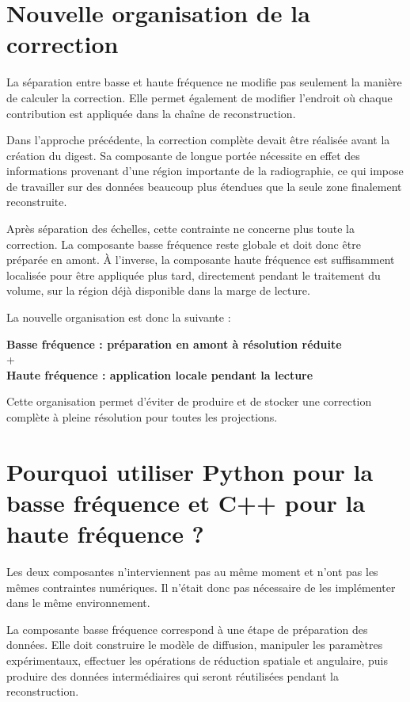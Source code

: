 \documentclass[11pt,a4paper]{report}
\begin{document}
\section{Nouvelle organisation de la correction}

La séparation entre basse et haute fréquence ne modifie pas seulement la
manière de calculer la correction. Elle permet également de modifier
l'endroit où chaque contribution est appliquée dans la chaîne de
reconstruction.

Dans l'approche précédente, la correction complète devait être réalisée
avant la création du digest. Sa composante de longue portée nécessite en
effet des informations provenant d'une région importante de la
radiographie, ce qui impose de travailler sur des données beaucoup plus
étendues que la seule zone finalement reconstruite.

Après séparation des échelles, cette contrainte ne concerne plus toute la
correction. La composante basse fréquence reste globale et doit donc être
préparée en amont. À l'inverse, la composante haute fréquence est
suffisamment localisée pour être appliquée plus tard, directement pendant
le traitement du volume, sur la région déjà disponible dans la marge de
lecture.

La nouvelle organisation est donc la suivante :

\begin{center}
\textbf{Basse fréquence : préparation en amont à résolution réduite}
\\[0.3em]
+
\\[0.3em]
\textbf{Haute fréquence : application locale pendant la lecture}
\end{center}

Cette organisation permet d'éviter de produire et de stocker une correction
complète à pleine résolution pour toutes les projections.

\section{Pourquoi utiliser Python pour la basse fréquence et C++ pour la haute fréquence ?}

Les deux composantes n'interviennent pas au même moment et n'ont pas les
mêmes contraintes numériques. Il n'était donc pas nécessaire de les
implémenter dans le même environnement.

La composante basse fréquence correspond à une étape de préparation des
données. Elle doit construire le modèle de diffusion, manipuler les
paramètres expérimentaux, effectuer les opérations de réduction spatiale et
angulaire, puis produire des données intermédiaires qui seront réutilisées
pendant la reconstruction.
\end{document}
